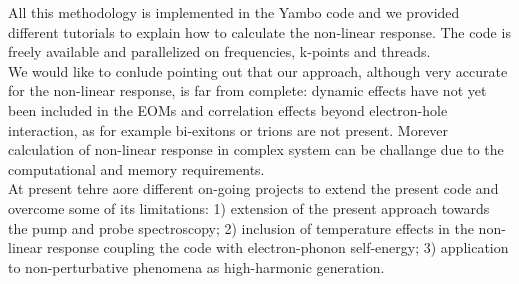 All this methodology is implemented in the Yambo code\cite{yambo} and we provided different tutorials to explain how to calculate the non-linear response.\cite{yambo_wiki} The code is freely available and parallelized on frequencies, k-points and threads. \\
We would like to conlude pointing out that our approach, although very accurate for the non-linear response, is far from complete: dynamic effects have not yet been included in the EOMs and correlation effects beyond electron-hole interaction, as for example bi-exitons or trions are not present.\cite{schafer} Morever calculation of non-linear response in complex system can be challange due to the computational and memory requirements.\\
At present tehre aore different on-going projects to extend the present code and overcome some of its limitations: 1) extension of the present approach towards the pump and probe spectroscopy; 2) inclusion of temperature effects in the non-linear response coupling the code with electron-phonon self-energy; 3) application to non-perturbative phenomena as high-harmonic generation.




